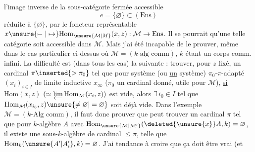 
l'image inverse de la sous-catégorie fermée accessible 
\[
e=\{\varnothing\}\subset(\mathrm{Ens})
\]
réduite à $\{\varnothing\}$, par le foncteur représentable
$x\unsure{\mapstochar\relbar|\mapsto}\mathrm{Hom}_{\unsure{\mathcal M|M}}(x,z):\mathcal M\to\mathrm{Ens}$. Il se pourrait  qu'une telle catégorie soit  accessible dans $\mathcal M$. Mais j'ai été incapable de le prouver, même dans le cas particulier ci-dessus où $\mathcal M=(k\text{-alg comm})$, $k$ étant un corps comm. infini. La difficulté est (dans tous les cas) la suivante : trouver,
pour $z$ fixé, un cardinal $\pi\inserted{>\pi_0}$ tel que pour   système (ou \uline{un} système) $\pi_0$-$\pi$-adapté $(x_i)_{i\in I}$ de limite inductive $x_{\infty}$ ($\pi_0$ un cardinal donné, utile pour $\mathcal M$),
\uline{si} $\mathrm{Hom}(x,z)$  $(\simeq\varprojlim\mathrm{Hom}_{\mathcal M}(x_i,z))$ est vide, alors $\exists\,i_0\in I$ tel que
$\mathrm{Hom}_{\mathcal M}(x_{i_0},z)\unsure{\ne\varnothing|=\varnothing}$
soit déjà vide. Dans l'exemple $\mathcal M=(k\text{-Alg comm})$, il faut donc prouver que  peut trouver un cardinal $\pi$ tel que pour  $k$-algèbre $A$ avec
$\mathrm{Hom}_{\unsure{\mathcal M|\mathcal M'}}(\deleted{\unsure{x}}A,k)=\varnothing$, il existe une sous-$k$-algèbre  de cardinal $\leq\pi$, telle
que $\mathrm{Hom}_{k}(\unsure{A'|A'_i},k)=\varnothing$. J'ai  tendance à croire que ça doit être vrai (et  
